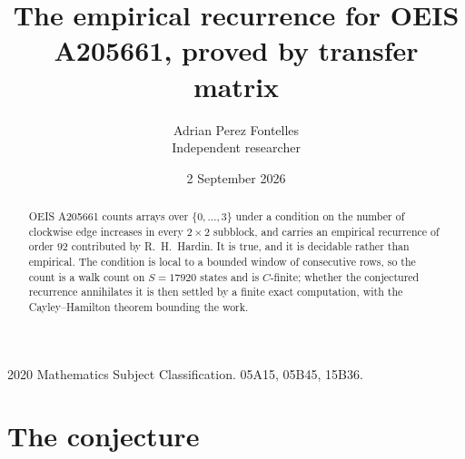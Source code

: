 \documentclass[11pt,a4paper]{article}
\title{The empirical recurrence for OEIS A205661, proved by transfer matrix}
\author{Adrian Perez Fontelles\\ \small Independent researcher}
\date{2 September 2026}
\theoremstyle{plain}
\theoremstyle{definition}
\begin{document}
\maketitle

\begin{abstract}
OEIS A205661 counts arrays over $\{0,\dots,3\}$ under a condition on the number of clockwise edge increases
in every $2\times2$ subblock, and carries an empirical recurrence of order $92$ contributed by
R.~H.~Hardin. It is true, and it is decidable rather than empirical. The condition is local to
a bounded window of consecutive rows, so the count is a walk count on $S=17920$ states and is
$C$-finite; whether the conjectured recurrence annihilates it is then settled by a finite exact
computation, with the Cayley--Hamilton theorem bounding the work.
\end{abstract}

\noindent\small 2020 Mathematics Subject Classification. 05A15, 05B45, 15B36.\normalsize

\section{The conjecture}
\end{document}

